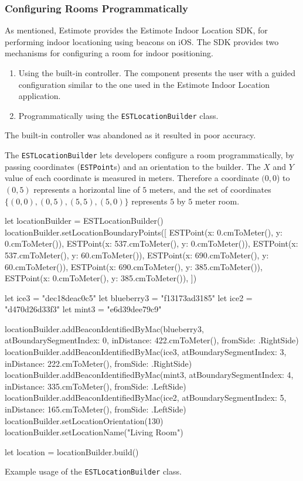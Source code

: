 \subsubsection{Configuring Rooms Programmatically}
As mentioned, Estimote provides the Estimote Indoor Location SDK, 
for performing indoor locationing using beacons on iOS. 
The SDK provides two mechanisms for configuring a room for indoor positioning.

\begin{enumerate}
\item Using the built-in controller. The component presents the user with a guided configuration similar to the one used in the Estimote Indoor Location application.
\item Programmatically using the \texttt{ESTLocationBuilder} class.
\end{enumerate}

The built-in controller was abandoned as it resulted in poor accuracy.

The \texttt{ESTLocationBuilder} lets developers configure a room programmatically, 
by passing coordinates (\texttt{ESTPoint}s) and an orientation to the builder. 
The $X$ and $Y$ value of each coordinate is measured in meters. 
Therefore a coordinate $(0, 0$) to $(0, 5)$ represents a horizontal line of $5$ meters, 
and the set of coordinates $\{(0,0),(0,5),(5,5),(5,0)\}$ represents $5$ by $5$ meter room.

\begin{listing}
\begin{swiftcode}
        let locationBuilder = ESTLocationBuilder()
        locationBuilder.setLocationBoundaryPoints([
            ESTPoint(x: 0.cmToMeter(), y: 0.cmToMeter()),
            ESTPoint(x: 537.cmToMeter(), y: 0.cmToMeter()),
            ESTPoint(x: 537.cmToMeter(), y: 60.cmToMeter()),
            ESTPoint(x: 690.cmToMeter(), y: 60.cmToMeter()),
            ESTPoint(x: 690.cmToMeter(), y: 385.cmToMeter()),
            ESTPoint(x: 0.cmToMeter(), y: 385.cmToMeter()),
        ])
        
        let ice3 = "dec18deac0c5"
        let blueberry3 = "f13173ad3185"
        let ice2 = "d470d26d33f3"
        let mint3 = "e6d39dee79c9"
        
        locationBuilder.addBeaconIdentifiedByMac(blueberry3, atBoundarySegmentIndex: 0, inDistance: 422.cmToMeter(), fromSide: .RightSide)
        locationBuilder.addBeaconIdentifiedByMac(ice3, atBoundarySegmentIndex: 3, inDistance: 222.cmToMeter(), fromSide: .RightSide)
        locationBuilder.addBeaconIdentifiedByMac(mint3, atBoundarySegmentIndex: 4, inDistance: 335.cmToMeter(), fromSide: .LeftSide)
        locationBuilder.addBeaconIdentifiedByMac(ice2, atBoundarySegmentIndex: 5, inDistance: 165.cmToMeter(), fromSide: .LeftSide)
        locationBuilder.setLocationOrientation(130)
        locationBuilder.setLocationName("Living Room")
        
        let location = locationBuilder.build()
\end{swiftcode}
\caption{Example usage of the \texttt{ESTLocationBuilder} class.}
\label{lst:estlocationbuilder}
\end{listing}

